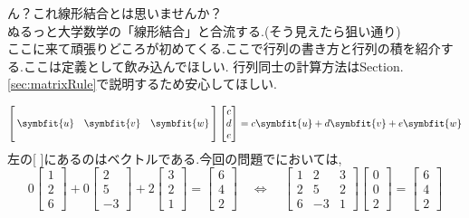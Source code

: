 ん？これ線形結合とは思いませんか？\\
ぬるっと大学数学の「線形結合」と合流する.(そう見えたら狙い通り)\\
ここに来て頑張りどころが初めてくる.ここで行列の書き方と行列の積を紹介する.ここは定義として飲み込んでほしい.
行列同士の計算方法はSection.\ref{sec:matrixRule}で説明するため安心してほしい.
\begin{tcolorbox}[colframe=black!80,colback=white,title=行列とベクトルの積]
\[
\begin{bmatrix}
    & & \\
    \:\symbfit{u}& \symbfit{v} & \symbfit{w} \: \\
    & & \\
\end{bmatrix}
\begin{bmatrix}c \\ d \\ e \end{bmatrix}
=
c\symbfit{u}+d\symbfit{v}+e\symbfit{w}
\]
左の[ \quad ]にあるのはベクトルである.今回の問題でにおいては,
\begin{equation}\label{eq:lenar_equal}
0
\begin{bmatrix} 1 \\ 2 \\ 6 \end{bmatrix}
+0
\begin{bmatrix} 2 \\ 5 \\ -3 \end{bmatrix}
+2
\begin{bmatrix} 3 \\ 2 \\ 1 \end{bmatrix}
=
\begin{bmatrix} 6 \\ 4 \\ 2 \end{bmatrix}\quad\Longleftrightarrow\quad
\begin{bmatrix}
    1 & 2 & 3 \\
    2 & 5 & 2 \\
    6 & -3 & 1
\end{bmatrix}
\begin{bmatrix}
    0 \\ 0 \\ 2
\end{bmatrix}
=
\begin{bmatrix}
    6 \\ 4 \\ 2
\end{bmatrix}
\end{equation}
\end{tcolorbox}
